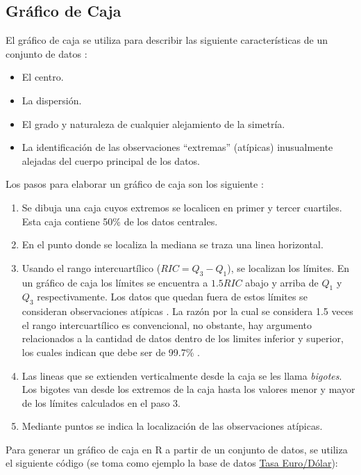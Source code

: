 \documentclass[
  11pt,
]{book}
\providecommand{\tightlist}{%
  \setlength{\itemsep}{0pt}\setlength{\parskip}{0pt}}
\theoremstyle{definition}
\theoremstyle{definition}
\theoremstyle{definition}
\theoremstyle{definition}
\theoremstyle{remark}
\begin{document}
\subsection{Gráfico de Caja}\label{topicos-graficos-caja}

El gráfico de caja se utiliza para describir las siguiente características de un conjunto de datos \citep[página 35]{Devore}:

\begin{itemize}
\tightlist
\item
  El centro.
\item
  La dispersión.
\item
  El grado y naturaleza de cualquier alejamiento de la simetría.
\item
  La identificación de las observaciones ``extremas'' (atípicas) inusualmente alejadas del cuerpo principal de los datos.
\end{itemize}

Los pasos para elaborar un gráfico de caja son los siguiente \citep[página 106]{anderson}:

\begin{enumerate}
\def\labelenumi{\arabic{enumi}.}
\tightlist
\item
  Se dibuja una caja cuyos extremos se localicen en primer y tercer cuartiles. Esta caja contiene 50\% de los datos centrales.
\item
  En el punto donde se localiza la mediana se traza una linea horizontal.
\item
  Usando el rango intercuartílico (\(RIC = Q_3-Q_1\)), se localizan los límites. En un gráfico de caja los límites se encuentra a \(1.5RIC\) abajo y arriba de \(Q_1\) y \(Q_3\) respectivamente. Los datos que quedan fuera de estos límites se consideran observaciones atípicas \citep{Tukey}. La razón por la cual se considera 1.5 veces el rango intercuartílico es convencional, no obstante, hay argumento relacionados a la cantidad de datos dentro de los limites inferior y superior, los cuales indican que debe ser de 99.7\% \citep{James2013}.
\item
  Las lineas que se extienden verticalmente desde la caja se les llama \emph{bigotes}. Los bigotes van desde los extremos de la caja hasta los valores menor y mayor de los límites calculados en el paso 3.
\item
  Mediante puntos se indica la localización de las observaciones atípicas.
\end{enumerate}

Para generar un gráfico de caja en R a partir de un conjunto de datos, se utiliza el siguiente código (se toma como ejemplo la base de datos \hyperref[TasaEURUSD]{Tasa Euro/Dólar}):
\end{document}
